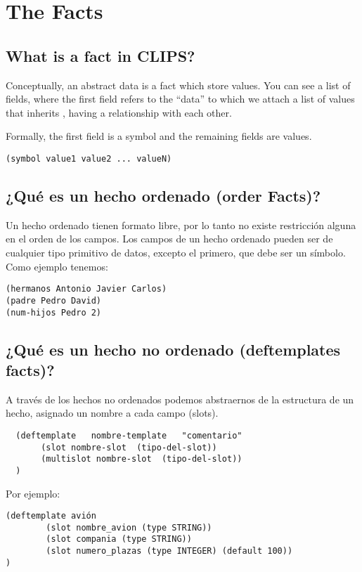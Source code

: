 \documentclass[11pt,svgnames]{scrbook}
\begin{document}
\section{The Facts}

\subsection{What is a fact in CLIPS?}
Conceptually, an abstract data is a fact which store values. You can see a list of fields, where the first field refers to the ``data'' to which we attach a list of values that inherits
, having a relationship with each other.

Formally, the first field is a symbol and the remaining fields are values.

\medskip

\texttt{(symbol  value1 value2  ...  valueN)}

\subsection{¿Qué es un hecho ordenado (order Facts)?}

Un hecho ordenado tienen formato libre, por lo tanto no existe restricción alguna en el orden de los campos. Los campos de un hecho ordenado pueden ser de cualquier tipo primitivo de datos, excepto el primero, que debe ser un símbolo.
Como ejemplo tenemos:


\begin{verbatim}
(hermanos Antonio Javier Carlos)
(padre Pedro David)
(num-hijos Pedro 2)\end{verbatim}

\subsection{¿Qué es un hecho no ordenado (deftemplates facts)?}



A través de los hechos no ordenados podemos abstraernos de la estructura de un hecho, asignado  un nombre a cada campo (slots).

\begin{verbatim}
  (deftemplate   nombre-template   "comentario"
       (slot nombre-slot  (tipo-del-slot))
       (multislot nombre-slot  (tipo-del-slot))
  )
\end{verbatim}

Por ejemplo:

\begin{verbatim}
(deftemplate avión
        (slot nombre_avion (type STRING))
        (slot compania (type STRING))
        (slot numero_plazas (type INTEGER) (default 100))
)\end{verbatim}
\end{document}
